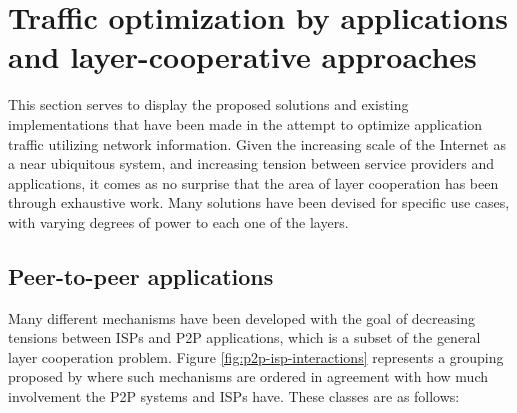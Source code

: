     \section{Traffic optimization by applications and layer-cooperative approaches}

        This section serves to display the proposed solutions and existing implementations that have been made in the attempt to optimize application traffic utilizing network information.
        Given the increasing scale of the Internet as a near ubiquitous system, and increasing tension between service providers and applications, it comes as no surprise that the area of layer cooperation has been through exhaustive work.
        Many solutions have been devised for specific use cases, with varying degrees of power to each one of the layers.

        \subsection{Peer-to-peer applications}

        Many different mechanisms have been developed with the goal of decreasing tensions between ISPs and P2P applications, which is a subset of the general layer cooperation problem.
        Figure \ref{fig:p2p-isp-interactions} represents a grouping proposed by \cite{dan-Commag10} where such mechanisms are ordered in agreement with how much involvement the P2P systems and ISPs have. These classes are as follows:

